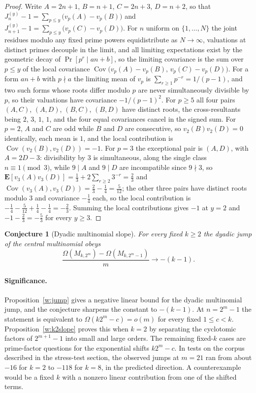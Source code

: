 \documentclass[11pt]{article}
\newtheorem{conjecture}{Conjecture}
\theoremstyle{definition}
\begin{document}
\begin{proof}
Write $A=2n+1$, $B=n+1$, $C=2n+3$, $D=n+2$, so that $J^{(y)}_n-1=\sum_{p\le y}\bigl(v_p(A)-v_p(B)\bigr)$ and $J^{(y)}_{n+1}-1=\sum_{p\le y}\bigl(v_p(C)-v_p(D)\bigr)$.  For $n$ uniform on $\{1,\ldots,N\}$ the joint residues modulo any fixed prime powers equidistribute as $N\to\infty$, valuations at distinct primes decouple in the limit, and all limiting expectations exist by the geometric decay of $\Pr[p^r\mid an+b]$, so the limiting covariance is the sum over $p\le y$ of the local covariance $\operatorname{Cov}\bigl(v_p(A)-v_p(B),\,v_p(C)-v_p(D)\bigr)$.  For a form $an+b$ with $p\nmid a$ the limiting mean of $v_p$ is $\sum_{r\ge1}p^{-r}=1/(p-1)$, and two such forms whose roots differ modulo $p$ are never simultaneously divisible by $p$, so their valuations have covariance $-1/(p-1)^2$.  For $p\ge5$ all four pairs $(A,C)$, $(A,D)$, $(B,C)$, $(B,D)$ have distinct roots, the cross-resultants being $2$, $3$, $1$, $1$, and the four equal covariances cancel in the signed sum.  For $p=2$, $A$ and $C$ are odd while $B$ and $D$ are consecutive, so $v_2(B)v_2(D)=0$ identically, each mean is $1$, and the local contribution is $\operatorname{Cov}(v_2(B),v_2(D))=-1$.  For $p=3$ the exceptional pair is $(A,D)$, with $A=2D-3$: divisibility by $3$ is simultaneous, along the single class $n\equiv1\pmod3$, while $9\mid A$ and $9\mid D$ are incompatible since $9\nmid3$, so $\mathbf E[v_3(A)v_3(D)]=\tfrac13+2\sum_{r\ge2}3^{-r}=\tfrac23$ and $\operatorname{Cov}(v_3(A),v_3(D))=\tfrac23-\tfrac14=\tfrac5{12}$; the other three pairs have distinct roots modulo $3$ and covariance $-\tfrac14$ each, so the local contribution is $-\tfrac14-\tfrac5{12}+\tfrac14-\tfrac14=-\tfrac23$.  Summing the local contributions gives $-1$ at $y=2$ and $-1-\tfrac23=-\tfrac53$ for every $y\ge3$.
\end{proof}

\begin{conjecture}[Dyadic multinomial slope]\label{w18}
For every fixed $k\ge2$ the dyadic jump of the central multinomial obeys
\[
\frac{\Omega(M_{k,2^m})-\Omega(M_{k,2^m-1})}{m}\longrightarrow-(k-1).
\]
\end{conjecture}

\paragraph{Significance.}
Proposition~\ref{w:jump} gives a negative linear bound for the dyadic multinomial jump, and the conjecture sharpens the constant to $-(k-1)$.  At $n=2^m-1$ the statement is equivalent to $\Omega(k2^m-c)=o(m)$ for every fixed $1\le c<k$.  Proposition~\ref{w:k2slope} proves this when $k=2$ by separating the cyclotomic factors of $2^{m+1}-1$ into small and large orders.  The remaining fixed-$k$ cases are prime-factor questions for the exponential shifts $k2^m-c$.  In tests on the corpus described in the stress-test section, the observed jumps at $m=21$ ran from about $-16$ for $k=2$ to $-118$ for $k=8$, in the predicted direction.  A counterexample would be a fixed $k$ with a nonzero linear contribution from one of the shifted terms.
\end{document}
